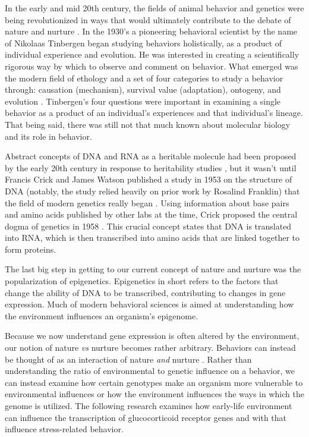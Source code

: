 \documentclass[12pt,twoside]{reedthesis}
\begin{document}
In the early and mid 20th century, the fields of animal behavior and
genetics were being revolutionized in ways that would ultimately contribute to the debate of
nature and nurture \citep{krubitzer_nature_2003}. In the 1930's a pioneering behavioral scientist by the name of Nikolaas Tinbergen began
studying behaviors holistically, as a product of individual
experience and evolution. He was interested in creating a scientifically
rigorous way by which to observe and comment on behavior.
What emerged was the modern field of ethology and a set of four categories to
study a behavior through: causation (mechanism), survival value (adaptation),
ontogeny, and evolution \citep{tinbergen_aims_2005}.
Tinbergen's four questions were important in examining a single behavior as a product of an
individual's experiences and that individual's lineage. That being said, there
was still not that much known about molecular biology and its role in behavior.

Abstract concepts of DNA and RNA as a heritable molecule had been proposed by the early 20th century in response to heritability
studies \citep{koltzoff_structure_1934, hershey_independent_1952}, but it wasn't until
Francis Crick and James Watson published a study in 1953 on the structure of DNA
(notably, the 
study relied heavily on prior work by Rosalind Franklin) that
the field of modern genetics really began \citep{watson_molecular_1953}. Using
information about base pairs and amino acids published by other labs at the
time, Crick proposed the
central dogma of genetics in 1958 \citep{crick_protein_1958}. This crucial concept states that DNA is translated into RNA, which is then
transcribed into amino acids that are linked together to form proteins.

The last big step in getting to our current concept of nature and nurture was
the popularization of epigenetics. Epigenetics in short refers to
the factors that change the ability of DNA to be transcribed, contributing to
changes in gene expression. Much of modern behavioral sciences is aimed at understanding
how the environment influences an organism's epigenome. 

Because we now understand gene expression is often altered by the environment, our notion of
nature \textit{vs} nurture becomes rather arbitrary. Behaviors can instead be
thought of as an interaction of nature \textit{and} nurture
\citep{sasaki_nature_2017, meaney_nature_2006}. Rather than
understanding the ratio of environmental to genetic influence on a behavior, we
can instead examine how certain genotypes make an organism more vulnerable to
environmental influences or how the environment influences the ways in which the
genome is utilized. The following research examines how early-life environment
can influence the transcription of glucocorticoid receptor genes and with that
influence stress-related behavior.  
\end{document}
